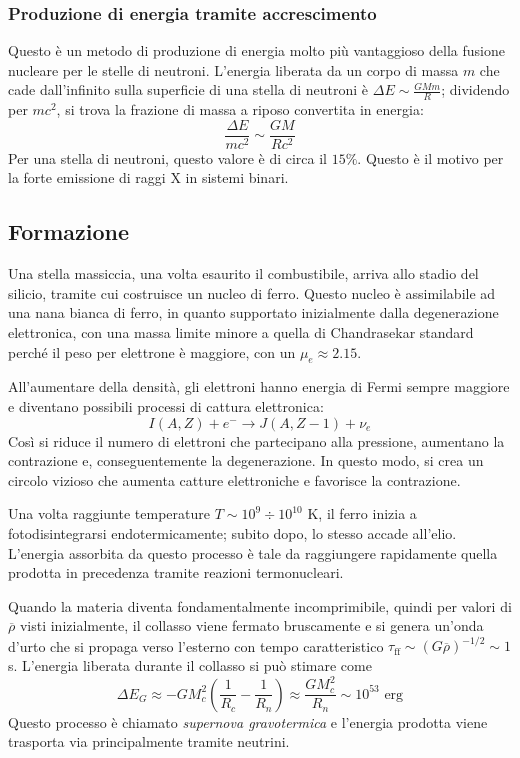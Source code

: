 \documentclass[11pt, a4paper]{scrartcl}
\theoremstyle{style}
\theoremstyle{style1}
\numberwithin{equation}{subsection}
\begin{document}
\subsubsection{Produzione di energia tramite accrescimento}

Questo \`e un metodo di produzione di energia molto pi\`u vantaggioso della fusione nucleare per le stelle di neutroni.
L'energia liberata da un corpo di massa $m $ che cade dall'infinito sulla superficie di una stella di neutroni \`e $\Delta E \sim \frac{GM m}{R}$; dividendo per $mc^2$, si trova la frazione di massa a riposo convertita in energia:
\[
\frac{\Delta E}{mc^2} \sim \frac{GM}{Rc^2}
\] 
Per una stella di neutroni, questo valore \`e di circa il $15\%$.
Questo \`e il motivo per la forte emissione di raggi X in sistemi binari.

\subsection{Formazione}

Una stella massiccia, una volta esaurito il combustibile, arriva allo stadio del silicio, tramite cui costruisce un nucleo di ferro.
Questo nucleo \`e assimilabile ad una nana bianca di ferro, in quanto supportato inizialmente dalla degenerazione elettronica, con una massa limite minore a quella di Chandrasekar standard perch\'e il peso per elettrone \`e maggiore, con un $\mu _e \approx 2.15$.

All'aumentare della densit\`a, gli elettroni hanno energia di Fermi sempre maggiore e diventano possibili processi di cattura elettronica:
\[
I(A,Z) + e^- \to J(A,Z-1) +\nu _e
\] 
Cos\`i si riduce il numero di elettroni che partecipano alla pressione, aumentano la contrazione e, conseguentemente la degenerazione.
In questo modo, si crea un circolo vizioso che aumenta catture elettroniche e favorisce la contrazione.

Una volta raggiunte temperature $T \sim 10^9 \div 10^{10} $ K, il ferro inizia a fotodisintegrarsi endotermicamente; subito dopo, lo stesso accade all'elio.
L'energia assorbita da questo processo \`e tale da raggiungere rapidamente quella prodotta in precedenza tramite reazioni termonucleari.

Quando la materia diventa fondamentalmente incomprimibile, quindi per valori di $\overline{\rho }$ visti inizialmente, il collasso viene fermato bruscamente e si genera un'onda d'urto che si propaga verso l'esterno con tempo caratteristico $\tau _\text{ff} \sim (G\overline{\rho })^{- 1 / 2} \sim 1$ s.
L'energia liberata durante il collasso si pu\`o stimare come
\[
\Delta E_G \approx -GM^2_c \left(\frac{1}{R_c} - \frac{1}{R_n}\right) \approx \frac{GM_c^2}{R_n} \sim 10^{53} \text{ erg}
\] 
Questo processo \`e chiamato \textit{supernova gravotermica} e l'energia prodotta viene trasporta via principalmente tramite neutrini.
\end{document}
